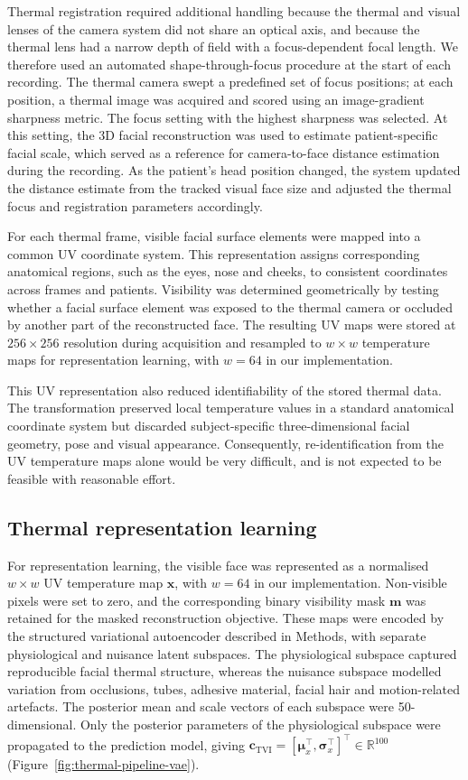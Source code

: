 \documentclass[11pt]{article}
\begin{document}
Thermal registration required additional handling because the thermal and visual lenses of the camera system did not share an optical axis, and because the thermal lens had a narrow depth of field with a focus-dependent focal length. We therefore used an automated shape-through-focus procedure at the start of each recording. The thermal camera swept a predefined set of focus positions; at each position, a thermal image was acquired and scored using an image-gradient sharpness metric. The focus setting with the highest sharpness was selected. At this setting, the 3D facial reconstruction was used to estimate patient-specific facial scale, which served as a reference for camera-to-face distance estimation during the recording. As the patient's head position changed, the system updated the distance estimate from the tracked visual face size and adjusted the thermal focus and registration parameters accordingly.

For each thermal frame, visible facial surface elements were mapped into a common UV coordinate system. This representation assigns corresponding anatomical regions, such as the eyes, nose and cheeks, to consistent coordinates across frames and patients. Visibility was determined geometrically by testing whether a facial surface element was exposed to the thermal camera or occluded by another part of the reconstructed face. The resulting UV maps were stored at $256\times256$ resolution during acquisition and resampled to $w\times w$ temperature maps for representation learning, with $w=64$ in our implementation.

This UV representation also reduced identifiability of the stored thermal data. The transformation preserved local temperature values in a standard anatomical coordinate system but discarded subject-specific three-dimensional facial geometry, pose and visual appearance. Consequently, re-identification from the UV temperature maps alone would be very difficult, and is not expected to be feasible with reasonable effort.

\subsection*{Thermal representation learning}

For representation learning, the visible face was represented as a normalised $w\times w$ UV temperature map $\mathbf{x}$, with $w=64$ in our implementation. Non-visible pixels were set to zero, and the corresponding binary visibility mask $\mathbf{m}$ was retained for the masked reconstruction objective. These maps were encoded by the structured variational autoencoder described in Methods, with separate physiological and nuisance latent subspaces. The physiological subspace captured reproducible facial thermal structure, whereas the nuisance subspace modelled variation from occlusions, tubes, adhesive material, facial hair and motion-related artefacts. The posterior mean and scale vectors of each subspace were 50-dimensional. Only the posterior parameters of the physiological subspace were propagated to the prediction model, giving $\mathbf{c}_{\mathrm{TVI}}=\left[\bm{\mu}_{x}^{\top},\bm{\sigma}_{x}^{\top}\right]^{\top}\in\mathbb{R}^{100}$ (Figure~\ref{fig:thermal-pipeline-vae}).
\end{document}
